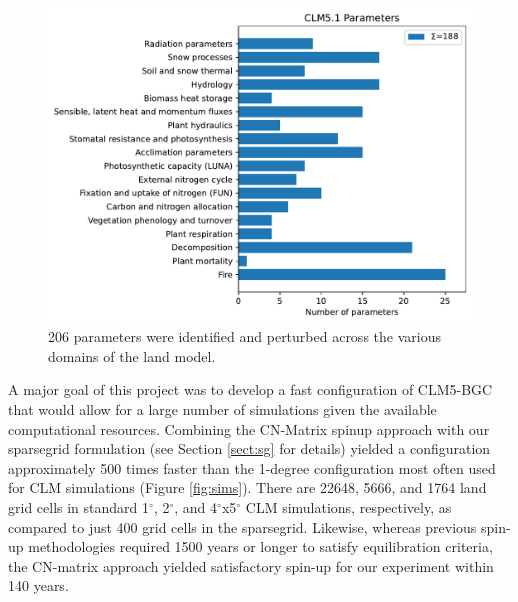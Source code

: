 \documentclass[draft]{agujournal2019}
\begin{document}
\begin{figure}[h]
\centering
\includegraphics[width=30pc]{../figs/bar.pdf}
\caption{206 parameters were identified and perturbed across the various domains of the land model.}
\label{fig:params}
\end{figure}

A major goal of this project was to develop a fast configuration of CLM5-BGC that would allow for a large number of simulations given the available computational resources.
Combining the CN-Matrix spinup approach with our sparsegrid formulation (see Section \ref{sect:sg} for details) yielded a configuration approximately 500 times faster than the 1-degree configuration most often used for CLM simulations (Figure \ref{fig:sims}).
There are 22648, 5666, and 1764 land grid cells in standard 1$^{\circ}$, 2$^{\circ}$, and 4$^{\circ}$x5$^{\circ}$ CLM simulations, respectively, as compared to just 400 grid cells in the sparsegrid.
Likewise, whereas previous spin-up methodologies required 1500 years or longer to satisfy equilibration criteria, the CN-matrix approach yielded satisfactory spin-up for our experiment within 140 years.
\end{document}
